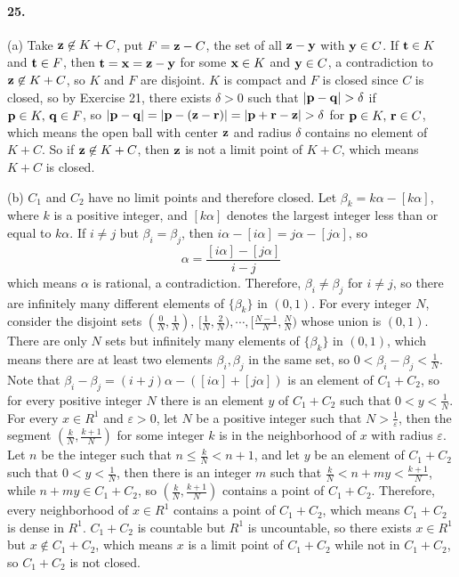\documentclass[a4paper]{article}
\begin{document}
\paragraph{25.}
(a) Take $\mathbf{z}\not\in K+C$, put $F=\mathbf{z}-C$, the set of all $\mathbf{z}-\mathbf{y}$ with $\mathbf{y}\in C$. If $\mathbf{t}\in K$ and $\mathbf{t}\in F$, then $\mathbf{t}=\mathbf{x}=\mathbf{z}-\mathbf{y}$ for some $\mathbf{x}\in K$ and $\mathbf{y}\in C$, a contradiction to $\mathbf{z}\not\in K+C$, so $K$ and $F$ are disjoint. $K$ is compact and $F$ is closed since $C$ is closed, so by Exercise 21, there exists $\delta>0$ such that $|\V{p}-\V{q}|>\delta$ if $\mathbf{p}\in K,\,\mathbf{q}\in F$, so $|\V{p}-\V{q}|=|\V{p}-(\V{z}-\V{r})|=|\V{p}+\V{r}-\V{z}|>\delta$ for $\mathbf{p}\in K,\,\mathbf{r}\in C$, which means the open ball with center $\mathbf{z}$ and radius $\delta$ contains no element of $K+C$. So if $\mathbf{z}\not\in K+C$, then $\mathbf{z}$ is not a limit point of $K+C$, which means $K+C$ is closed.
\medskip

(b)
$C_1$ and $C_2$ have no limit points and therefore closed. Let $\beta_k=k\alpha-[k\alpha]$, where $k$ is a positive integer, and $[k\alpha]$ denotes the largest integer less than or equal to $k\alpha$. If $i\neq j$ but $\beta_i=\beta_j$, then $i\alpha-[i\alpha]=j\alpha-[j\alpha]$, so
\[
\alpha=\frac{[i\alpha]-[j\alpha]}{i-j}
\]
which means $\alpha$ is rational, a contradiction. Therefore, $\beta_i\neq\beta_j$ for $i\neq j$, so there are infinitely many different elements of $\{\beta_k\}$ in $(0,1)$. For every integer $N$, consider the disjoint sets $(\frac{0}{N},\frac{1}{N}),\,[\frac{1}{N},\frac{2}{N}),\cdots,[\frac{N-1}{N},\frac{N}{N})$ whose union is $(0,1)$. There are only $N$ sets but infinitely many elements of $\{\beta_k\}$ in $(0,1)$, which means there are at least two elements $\beta_i,\beta_j$ in the same set, so $0<\beta_i-\beta_j<\frac{1}{N}$. Note that $\beta_i-\beta_j=(i+j)\alpha-([i\alpha]+[j\alpha])$ is an element of $C_1+C_2$, so for every positive integer $N$ there is an element $y$ of $C_1+C_2$ such that $0<y<\frac{1}{N}$. For every $x\in R^1$ and $\varepsilon>0$, let $N$ be a positive integer such that $N>\frac{1}{\varepsilon}$, then the segment $(\frac{k}{N},\frac{k+1}{N})$ for some integer $k$ is in the neighborhood of $x$ with radius $\varepsilon$. Let $n$ be the integer such that $n\leq\frac{k}{N}<n+1$, and let $y$ be an element of $C_1+C_2$ such that $0<y<\frac{1}{N}$, then there is an integer $m$ such that $\frac{k}{N}<n+my<\frac{k+1}{N}$, while $n+my\in C_1+C_2$, so $(\frac{k}{N},\frac{k+1}{N})$ contains a point of $C_1+C_2$. Therefore, every neighborhood of $x\in R^1$ contains a point of $C_1+C_2$, which means $C_1+C_2$ is dense in $R^1$.\; $C_1+C_2$ is countable but $R^1$ is uncountable, so there exists $x\in R^1$ but $x\not\in C_1+C_2$, which means $x$ is a limit point of $C_1+C_2$ while not in $C_1+C_2$, so $C_1+C_2$ is not closed.
\end{document}
